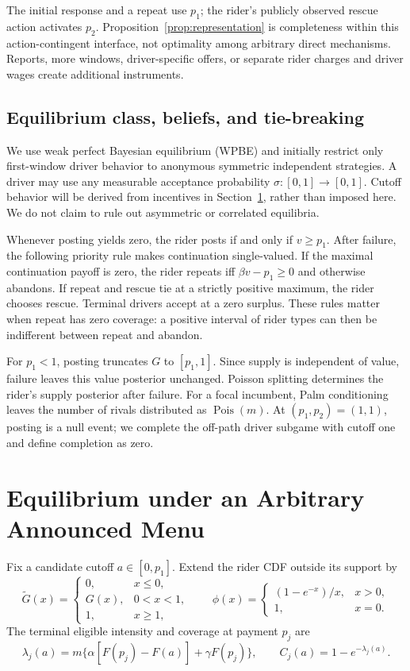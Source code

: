 \documentclass[mnsc,blindrev]{informs3}
\newcommand{\ph}{\phi}
\begin{document}
The initial response and a repeat use $p_1$; the rider's publicly observed
rescue action activates $p_2$.  Proposition~\ref{prop:representation} is
completeness within this action-contingent interface, not optimality among
arbitrary direct mechanisms.  Reports, more windows, driver-specific offers,
or separate rider charges and driver wages create additional instruments.

\subsection{Equilibrium class, beliefs, and tie-breaking}

We use weak perfect Bayesian equilibrium (WPBE) and initially restrict only
first-window driver behavior to anonymous symmetric independent strategies.
A driver may use any measurable acceptance probability
$\sigma:[0,1]\to[0,1]$.  Cutoff behavior will be derived from incentives in
Section~\ref{sec:equilibrium}, rather than imposed here.  We do not claim to
rule out asymmetric or correlated equilibria.

Whenever posting yields zero, the rider posts if and only if $v\ge p_1$.
After failure, the following priority rule makes continuation single-valued.
If the maximal continuation payoff is zero, the rider repeats iff
$\beta v-p_1\ge0$ and otherwise abandons.  If repeat and rescue tie at a
strictly positive maximum, the rider chooses rescue.  Terminal drivers accept
at a zero surplus.  These rules matter when repeat has zero coverage: a
positive interval of rider types can then be indifferent between repeat and
abandon.

For $p_1<1$, posting truncates $G$ to $[p_1,1]$.  Since supply is independent
of value, failure leaves this value posterior unchanged.  Poisson splitting
determines the rider's supply posterior after failure.  For a focal incumbent,
Palm conditioning leaves the number of rivals distributed as
$\operatorname{Pois}(m)$.
At $(p_1,p_2)=(1,1)$, posting is a null event; we complete the off-path driver
subgame with cutoff one and define completion as zero.

\section{Equilibrium under an Arbitrary Announced Menu}
\label{sec:equilibrium}

Fix a candidate cutoff \(a\in[0,p_1]\).  Extend the rider CDF outside its
support by
\[
 \widetilde G(x)=
 \begin{cases}
 0,&x\le0,\\
 G(x),&0<x<1,\\
 1,&x\ge1,
 \end{cases}
 \qquad
 \ph(x)=
 \begin{cases}(1-e^{-x})/x,&x>0,\\1,&x=0.\end{cases}
 \tag{1}
\]
The terminal eligible intensity and coverage at payment \(p_j\) are
\[
 \lambda_j(a)=m\{\alpha[F(p_j)-F(a)]+\gamma F(p_j)\},
 \qquad C_j(a)=1-e^{-\lambda_j(a)}.                       \tag{2}
\]
\end{document}
